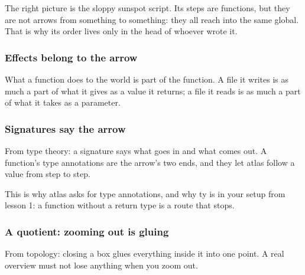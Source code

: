 \documentclass[12pt, a4paper]{article}
\theoremstyle{definition}
\theoremstyle{remark}
\begin{document}
The right picture is the sloppy sunspot script. Its steps are functions, but they are not arrows from something to something: they all reach into the same global. That is why its order lives only in the head of whoever wrote it.

\subsubsection{Effects belong to the arrow}
What a function does to the world is part of the function. A file it writes is as much a part of what it gives as a value it returns; a file it reads is as much a part of what it takes as a parameter.


\subsubsection{Signatures say the arrow}
From type theory: a signature says what goes in and what comes out. A function's type annotations are the arrow's two ends, and they let atlas follow a value from step to step.


This is why atlas asks for type annotations, and why ty is in your setup from lesson 1: a function without a return type is a route that stops.

\subsubsection{A quotient: zooming out is gluing}
From topology: closing a box glues everything inside it into one point. A real overview must not lose anything when you zoom out.

\end{document}
